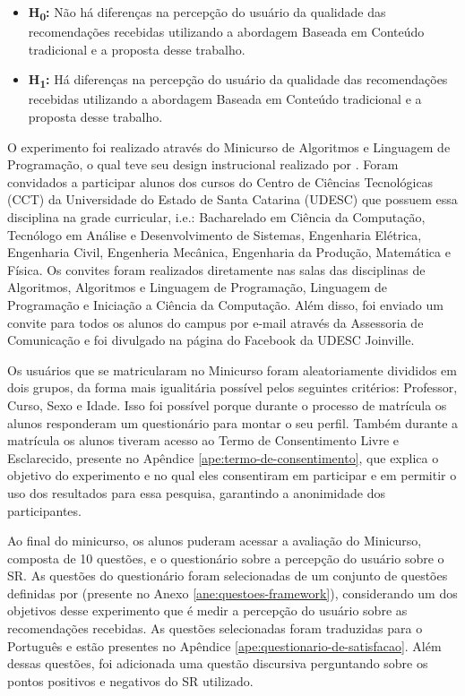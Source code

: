 \begin{itemize}
\item \textbf{H\textsubscript{0}:} Não há diferenças na percepção do usuário da qualidade das recomendações recebidas utilizando a abordagem
Baseada em Conteúdo tradicional e a proposta desse trabalho.
\item \textbf{H\textsubscript{1}:} Há diferenças na percepção do usuário da qualidade das recomendações recebidas utilizando a abordagem
Baseada em Conteúdo tradicional e a proposta desse trabalho.
\end{itemize}

O experimento foi realizado através do Minicurso de Algoritmos e Linguagem de Programação, o qual teve seu design
instrucional realizado por . Foram convidados a participar alunos dos cursos do
Centro de Ciências Tecnológicas (CCT) da Universidade do Estado de Santa Catarina (UDESC) que possuem essa disciplina na
grade curricular, i.e.: Bacharelado em Ciência da Computação, Tecnólogo em Análise e Desenvolvimento de Sistemas, Engenharia
Elétrica, Engenharia Civil, Engenheria Mecânica, Engenharia da Produção, Matemática e Física. Os convites foram
realizados diretamente nas salas das disciplinas de Algoritmos, Algoritmos e Linguagem de Programação, Linguagem de
Programação e Iniciação a Ciência da Computação. Além disso, foi enviado um convite para todos os alunos do campus por
e-mail através da Assessoria de Comunicação e foi divulgado na página do Facebook da UDESC Joinville.

Os usuários que se matricularam no Minicurso foram aleatoriamente divididos em dois grupos, da forma mais igualitária possível
pelos seguintes critérios: Professor, Curso, Sexo e Idade. Isso foi possível
porque durante o processo de matrícula os alunos responderam um questionário para montar o seu perfil. Também durante a
matrícula os alunos tiveram acesso ao Termo de Consentimento Livre e Esclarecido, presente no Apêndice
\ref{ape:termo-de-consentimento}, que explica o objetivo do experimento e no qual eles consentiram em participar e em
permitir o uso dos resultados para essa pesquisa, garantindo a anonimidade dos participantes.

Ao final do minicurso, os alunos puderam acessar a avaliação do Minicurso, composta de 10 questões, e o questionário
sobre a percepção do usuário sobre o SR. As questões do questionário foram selecionadas de um
conjunto de questões definidas por  (presente no Anexo \ref{ane:questoes-framework}), considerando
um dos objetivos desse experimento que é medir a percepção do usuário sobre as recomendações recebidas.
As questões selecionadas foram traduzidas para o Português e estão presentes no Apêndice \ref{ape:questionario-de-satisfacao}.
Além dessas questões, foi adicionada uma questão discursiva perguntando sobre os pontos positivos e negativos do SR utilizado.

